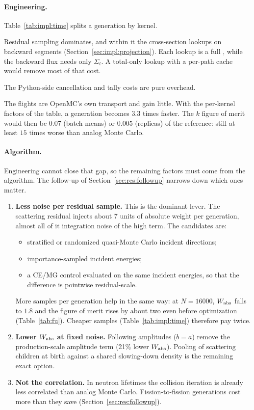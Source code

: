 \paragraph{Engineering.} Table~\ref{tab:impl:time} splits a generation by kernel.

Residual sampling dominates, and within it the cross-section lookups on backward segments
(Section~\ref{sec:impl:projection}). Each lookup is a full , while the
backward flux needs only $\Sigma_t$. A total-only lookup with a per-path cache would remove most of
that cost.

The Python-side cancellation and tally costs are pure overhead.

The flights are OpenMC's own transport and gain little. With the per-kernel factors of the table, a
generation becomes $3.3$ times faster. The $k$ figure of merit would then be $0.07$ (batch means) or
$0.005$ (replicas) of the reference: still at least $15$ times worse than analog Monte Carlo.

\paragraph{Algorithm.} Engineering cannot close that gap, so the remaining factors must come from
the algorithm. The follow-up of Section~\ref{sec:res:followup} narrows down which ones matter.
\begin{enumerate}
\item \textbf{Less noise per residual sample.} This is the dominant lever. The scattering residual
  injects about 7 units of absolute weight per generation, almost all of it integration noise of the
  high term. The candidates are:
  \begin{itemize}
  \item stratified or randomized quasi-Monte Carlo incident directions;
  \item importance-sampled incident energies;
  \item a CE/MG control evaluated on the same incident energies, so that the difference is
    pointwise residual-scale.
  \end{itemize}
  More samples per generation help in the same way: at $N=16000$, $W_{\mathrm{abs}}$ falls to $1.8$ and the
  figure of merit rises by about two even before optimization (Table~\ref{tab:fu}). Cheaper samples
  (Table~\ref{tab:impl:time}) therefore pay twice.
\item \textbf{Lower $W_{\mathrm{abs}}$ at fixed noise.} Following amplitudes ($b=a$) remove the production-scale
  amplitude term (21\% lower $W_{\mathrm{abs}}$). Pooling of scattering children at birth against a shared
  slowing-down density is the remaining exact option.
\item \textbf{Not the correlation.} In neutron lifetimes the collision iteration is already less
  correlated than analog Monte Carlo. Fission-to-fission generations cost more than they save
  (Section~\ref{sec:res:followup}).
\end{enumerate}

